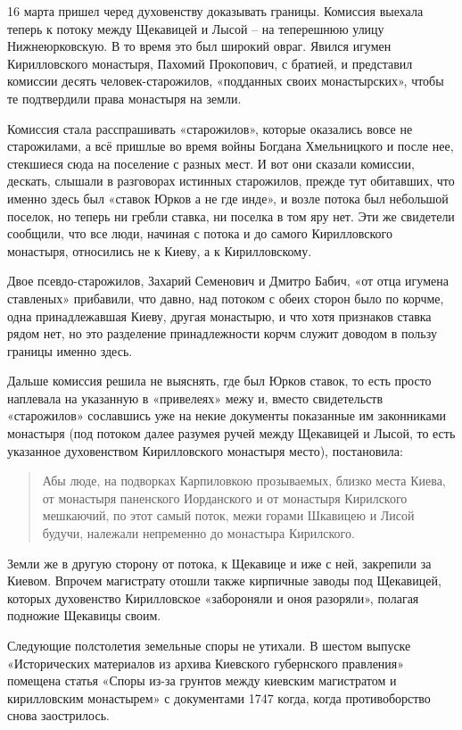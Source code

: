 16 марта пришел черед духовенству доказывать границы. Комиссия выехала теперь к потоку между Щекавицей и Лысой – на теперешнюю улицу Нижнеюрковскую. В то время это был широкий овраг. Явился игумен Кирилловского монастыря, Пахомий Прокопович, с братией, и представил комиссии десять человек-старожилов, «подданных своих монастырских», чтобы те подтвердили права монастыря на земли.

Комиссия стала расспрашивать «старожилов», которые оказались вовсе не старожилами, а всё пришлые во время войны Богдана Хмельницкого и после нее, стекшиеся сюда на поселение с разных мест. И вот они сказали комиссии, дескать, слышали в разговорах истинных старожилов, прежде тут обитавших, что именно здесь был «ставок Юрков а не где инде», и возле потока был небольшой поселок, но теперь ни гребли ставка, ни поселка в том яру нет. Эти же свидетели сообщили, что все люди, начиная с потока и до самого Кирилловского монастыря, относились не к Киеву, а к Кирилловскому.

Двое псевдо-старожилов, Захарий Семенович и Дмитро Бабич, «от отца игумена ставленых» прибавили, что давно, над потоком с обеих сторон было по корчме, одна принадлежавшая Киеву, другая монастырю, и что хотя признаков ставка рядом нет, но это разделение принадлежности корчм служит доводом в пользу границы именно здесь.

Дальше комиссия решила не выяснять, где был Юрков ставок, то есть просто наплевала на указанную в «привелеях» межу и, вместо свидетельств «старожилов» сославшись уже на некие документы показанные им законниками монастыря (под потоком далее разумея ручей между Щекавицей и Лысой, то есть указанное духовенством Кирилловского монастыря место), постановила:

\begin{quotation}
Абы люде, на подворках Карпиловкою прозываемых, близко места Киева, от монастыря паненского Иорданского и от монастыря Кирилского мешкаючий, по этот самый поток, межи горами Шкавицею и Лисой будучи, належали непременно до монастыра Кирилского.
\end{quotation}

Земли же в другую сторону от потока, к Щекавице и иже с ней, закрепили за Киевом. Впрочем магистрату отошли также кирпичные заводы под Щекавицей, которых духовенство Кирилловское «забороняли и оноя разоряли», полагая подножие Щекавицы своим.

Следующие полстолетия земельные споры не утихали. В шестом выпуске «Исторических материалов из архива Киевского губернского правления»\cite{histmatkiev} помещена статья «Споры из-за грунтов между киевским магистратом и кирилловским монастырем» с документами 1747 когда, когда противоборство снова заострилось. 

